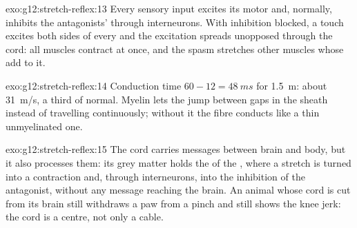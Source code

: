 \begin{solution}{exo:g12:stretch-reflex:13}
Every sensory input excites its motor  and, normally, inhibits
the antagonists' through interneurons. With inhibition blocked, a
touch excites both sides of every  and the excitation spreads
unopposed through the cord: all muscles contract at once, and the
spasm stretches other muscles whose  add to it.
\end{solution}

\begin{solution}{exo:g12:stretch-reflex:14}
Conduction time $60 - 12 = \qty{48}{ms}$ for \qty{1.5}{m}: about
\qty{31}{m/s}, a third of normal. Myelin lets the 
jump between gaps in the sheath instead of travelling continuously;
without it the fibre conducts like a thin unmyelinated one.
\end{solution}

\begin{solution}{exo:g12:stretch-reflex:15}
The cord carries messages between brain and body, but it also
processes them: its grey matter holds the  of the ,
where a stretch is turned into a contraction and, through interneurons,
into the inhibition of the antagonist, without any message reaching
the brain. An animal whose cord is cut from its brain still withdraws
a paw from a pinch and still shows the knee jerk: the cord is a
centre, not only a cable.
\end{solution}

